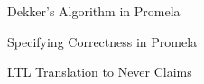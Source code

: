 \begin{wideslide}[bm=,toc=]{\large Dekker's Algorithm in Promela}
\end{wideslide}

\begin{wideslide}[bm=,toc=]{\large Specifying Correctness in Promela}
\end{wideslide}

\begin{wideslide}[bm=,toc=]{\large LTL Translation to Never Claims}
\end{wideslide}
